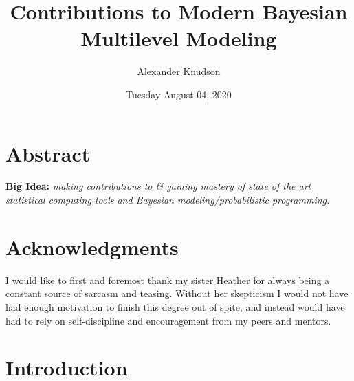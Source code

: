 \documentclass[
]{report}
\title{Contributions to Modern Bayesian Multilevel Modeling}
\author{Alexander Knudson}
\date{Tuesday August 04, 2020}
\begin{document}
\maketitle

{
\setcounter{tocdepth}{2}
\tableofcontents
}
\listoftables
\listoffigures
{}
\hypertarget{abstract}{%
\chapter*{Abstract}\label{abstract}}


\textbf{Big Idea:} \emph{making contributions to \& gaining mastery of state of the art statistical computing tools and Bayesian modeling/probabilistic programming.}

\hypertarget{acknowledgments}{%
\chapter*{Acknowledgments}\label{acknowledgments}}


I would like to first and foremost thank my sister Heather for always being a constant source of sarcasm and teasing. Without her skepticism I would not have had enough motivation to finish this degree out of spite, and instead would have had to rely on self-discipline and encouragement from my peers and mentors.

\hypertarget{introduction}{%
\chapter{Introduction}\label{introduction}}
\end{document}
